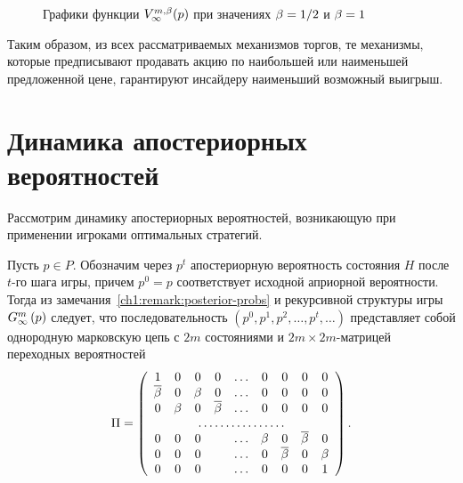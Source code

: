 {\begin{figure}[b]
  \centering
  \caption{Графики функции $V^{m,\beta}_\infty(p)$ при значениях $\beta = 1/2$ и $\beta = 1$}
  \label{ch1:fig:value-comparison}
\end{figure}

Таким образом, из всех рассматриваемых механизмов торгов, те механизмы, которые предписывают продавать акцию по наибольшей или наименьшей предложенной цене, гарантируют инсайдеру наименьший возможный выигрыш.

\section{Динамика апостериорных вероятностей}
Рассмотрим динамику апостериорных вероятностей, возникающую при применении игроками оптимальных стратегий.

Пусть $p \in P$. Обозначим через $p^t$ апостериорную вероятность состояния $H$ после $t$-го шага игры, причем $p^0 = p$ соответствует исходной априорной вероятности.
Тогда из замечания~\ref{ch1:remark:posterior-probs} и рекурсивной структуры игры $G_{\infty}^m\left({p}\right)$ следует, что последовательность $(p^0, p^1, p^2, \ldots, p^t, \ldots)$ представляет собой однородную марковскую цепь с $2m$ состояниями и $2m \times 2m$-матрицей переходных вероятностей
\begin{equation}
  \label{ch1:eq:posterior-chain}
  \Pi = 
  \left(
    \begin{array}{ccccccccc}
      1    & 0   & 0   & 0    & \ldots & 0   & 0    & 0    & 0   \\
      \DCo & 0   & \Co & 0    & \ldots & 0   & 0    & 0    & 0   \\
      0    & \Co & 0   & \DCo & \ldots & 0   & 0    & 0    & 0   \\
      \hdotsfor{9}                                               \\
      0    & 0   & 0   &      & \ldots & \Co & 0    & \DCo & 0   \\
      0    & 0   & 0   &      & \ldots & 0   & \DCo & 0    & \Co \\
      0    & 0   & 0   &      & \ldots & 0   & 0    & 0    & 1
    \end{array}
 \right).
\end{equation}

}
